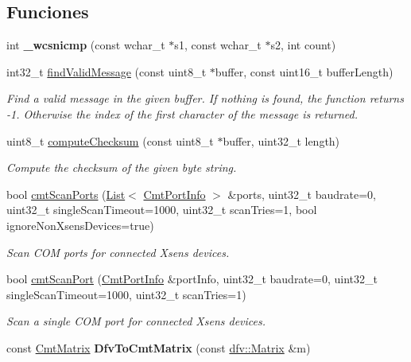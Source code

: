\subsection*{\-Funciones}
\begin{DoxyCompactItemize}
\item 
\hypertarget{namespacexsens_a83d67697db21fcfda80de872daed93ba}{int {\bfseries \-\_\-wcsnicmp} (const wchar\-\_\-t $\ast$s1, const wchar\-\_\-t $\ast$s2, int count)}\label{namespacexsens_a83d67697db21fcfda80de872daed93ba}

\item 
\hypertarget{namespacexsens_a4afd105a52b808febde0c645742b1d0d}{int32\-\_\-t \hyperlink{namespacexsens_a4afd105a52b808febde0c645742b1d0d}{find\-Valid\-Message} (const uint8\-\_\-t $\ast$buffer, const uint16\-\_\-t buffer\-Length)}\label{namespacexsens_a4afd105a52b808febde0c645742b1d0d}

\begin{DoxyCompactList}\small\item\em \-Find a valid message in the given buffer. \-If nothing is found, the function returns -\/1. \-Otherwise the index of the first character of the message is returned. \end{DoxyCompactList}\item 
\hypertarget{namespacexsens_a369decd7118608e7f18577d108064dbe}{uint8\-\_\-t \hyperlink{namespacexsens_a369decd7118608e7f18577d108064dbe}{compute\-Checksum} (const uint8\-\_\-t $\ast$buffer, uint32\-\_\-t length)}\label{namespacexsens_a369decd7118608e7f18577d108064dbe}

\begin{DoxyCompactList}\small\item\em \-Compute the checksum of the given byte string. \end{DoxyCompactList}\item 
bool \hyperlink{namespacexsens_a8610d936efa1d28e3095c5aed8ac75b6}{cmt\-Scan\-Ports} (\hyperlink{classxsens_1_1List}{\-List}$<$ \hyperlink{structCmtPortInfo}{\-Cmt\-Port\-Info} $>$ \&ports, uint32\-\_\-t baudrate=0, uint32\-\_\-t single\-Scan\-Timeout=1000, uint32\-\_\-t scan\-Tries=1, bool ignore\-Non\-Xsens\-Devices=true)
\begin{DoxyCompactList}\small\item\em \-Scan \-C\-O\-M ports for connected \-Xsens devices. \end{DoxyCompactList}\item 
bool \hyperlink{namespacexsens_a655fd426de1238dc2363cd3c4ce8e421}{cmt\-Scan\-Port} (\hyperlink{structCmtPortInfo}{\-Cmt\-Port\-Info} \&port\-Info, uint32\-\_\-t baudrate=0, uint32\-\_\-t single\-Scan\-Timeout=1000, uint32\-\_\-t scan\-Tries=1)
\begin{DoxyCompactList}\small\item\em \-Scan a single \-C\-O\-M port for connected \-Xsens devices. \end{DoxyCompactList}\item 
\hypertarget{namespacexsens_ab7a92b3f4a776042e575eb7d58d1621d}{const \hyperlink{structCmtMatrix}{\-Cmt\-Matrix} {\bfseries \-Dfv\-To\-Cmt\-Matrix} (const \hyperlink{classdfv_1_1Matrix}{dfv\-::\-Matrix} \&m)}\label{namespacexsens_ab7a92b3f4a776042e575eb7d58d1621d}


\end{DoxyCompactItemize}
